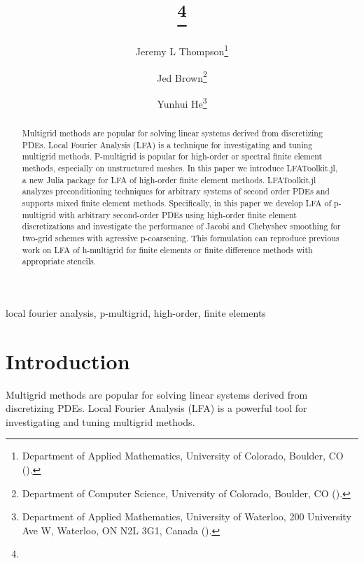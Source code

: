 \documentclass[review]{siamart190516}
\author{
Jeremy L Thompson\thanks{Department of Applied Mathematics, University of Colorado, Boulder, CO
  (\email{jeremy@jeremylt.org}).}
\and Jed Brown\thanks{Department of Computer Science, University of Colorado, Boulder, CO
  (\email{jed@jedbrown.org}).}
\and Yunhui He\thanks{Department of Applied Mathematics,
University of Waterloo, 200 University Ave W, Waterloo, ON N2L 3G1, Canada
  (\email{yunhui.he@uwaterloo.ca}).}
}
\title{{\TheTitle}\thanks{\TheFunding}}
\begin{document}
\maketitle

\vspace{1cm}

\begin{abstract}
Multigrid methods are popular for solving linear systems derived from discretizing PDEs.
Local Fourier Analysis (LFA) is a technique for investigating and tuning multigrid methods.
P-multigrid is popular for high-order or spectral finite element methods, especially on unstructured meshes.
In this paper we introduce LFAToolkit.jl, a new Julia package for LFA of high-order finite element methods.
LFAToolkit.jl analyzes preconditioning techniques for arbitrary systems of second order PDEs and supports mixed finite element methods.
Specifically, in this paper we develop LFA of p-multigrid with arbitrary second-order PDEs using high-order finite element discretizations and investigate the performance of Jacobi and Chebyshev smoothing for two-grid schemes with agressive p-coarsening.
This formulation can reproduce previous work on LFA of h-multigrid for finite elements or finite difference methods with appropriate stencils.
\end{abstract}

\begin{keywords}
  local fourier analysis, p-multigrid, high-order, finite elements
\end{keywords}

\section{Introduction}\label{sec:intro}

Multigrid methods \cite{brandt1982guide, briggs2000multigrid, stuben1982multigrid} are popular for solving linear systems derived from discretizing PDEs.
Local Fourier Analysis (LFA) \cite{brandt1977multi, wienands2004practical} is a powerful tool for investigating and tuning multigrid methods.
\end{document}

